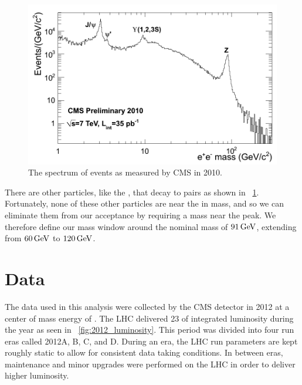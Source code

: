 \begin{figure}[!htbp]
    \centering
    \includegraphics[width=\textwidth]{figures/dielectron_mass_7tev.png}
    \caption{The spectrum of \ee events as measured by CMS in 2010.}
    \label{fig:ee_spectrum}
\end{figure}

There are other particles, like the \jpsi, that decay to \ee pairs as shown in
\FIG~\ref{fig:ee_spectrum}. Fortunately, none of these other particles are near
the \Z in mass, and so we can eliminate them from our acceptance by requiring a
mass near the \Z peak. We therefore define our mass window around the nominal
\Z mass of $91 \,\text{Ge\hspace{-.08em}V}$, extending from $60 \,\text{Ge\hspace{-.08em}V}$ to $120 \,\text{Ge\hspace{-.08em}V}$.

\section{Data}

The data used in this analysis were collected by the CMS detector in 2012 at a
center of mass energy of \rootseight. The LHC delivered 23 \fbinv of integrated
luminosity during the year as seen in \FIG~\ref{fig:2012_luminosity}. This
period was divided into four run eras called 2012A, B, C, and D. During an era,
the LHC run parameters are kept roughly static to allow for consistent data
taking conditions. In between eras, maintenance and minor upgrades were
performed on the LHC in order to deliver higher luminosity.

